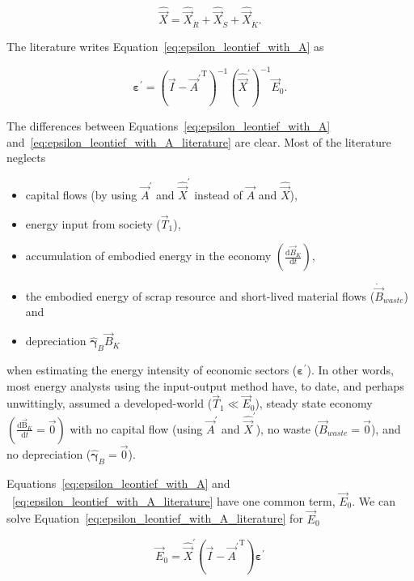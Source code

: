 \begin{equation}
	\hat{\vec{X}} = \hat{\vec{X}}_{\dot{R}} + \hat{\vec{X}}_{\dot{S}} + \hat{\vec{X}}_{\dot{K}}.
\end{equation}

The literature writes Equation~\ref{eq:epsilon_leontief_with_A} as

\begin{equation} \label{eq:epsilon_leontief_with_A_literature}
	\bm{\varepsilon^{'}} 
	= {\left( \vec{I} - {\vec{A}^{'}}^{\mathrm{T}} \right)}^{-1}
	\left( \hat{\vec{X}}^{'} \right) ^{-1}
	\vec{E}_{0}.
\end{equation}

The differences between Equations~\ref{eq:epsilon_leontief_with_A}
and~\ref{eq:epsilon_leontief_with_A_literature} are clear. 
Most of the literature neglects
\begin{itemize}
	\item{capital flows (by using $\vec{A}^{'}$ and $\hat{\vec{X}}^{'}$
			instead of $\vec{A}$ and $\hat{\vec{X}}$),}
	\item{energy input from society ($\vec{T}_{1}$),}
	\item{accumulation of embodied energy in the economy 
			$\left( \frac{\mathrm{d}\vec{B}_{K}}{\mathrm{d}t} \right)$,}
	\item{the embodied energy of scrap resource	and short-lived material flows 
			($\dot{\vec{B}}_{waste}$) and}
	\item{depreciation $\hat{\bm{\gamma}}_{B} \vec{B}_{K}$}
\end{itemize}

\noindent{}when estimating the energy intensity  
of economic sectors ($\bm{\varepsilon}^{'}$).
In other words, most energy analysts using the input-output method
have, to date, and perhaps unwittingly, assumed 
a developed-world ($\vec{T}_{1} \ll \vec{E}_{0}$),
steady state economy
$\left( \frac{\mathrm{d}\mathrm{\vec{B}}_{K}}{\mathrm{d}t}  
= \vec{0} \right)$ 
with 
no capital flow (using $\vec{A}^{'}$ and $\hat{\vec{X}}^{'}$),
no waste ($\vec{B}_{waste} = \vec{0}$), and
no depreciation ($\hat{\bm{\gamma}}_{B} = \vec{0}$).

Equations~\ref{eq:epsilon_leontief_with_A} 
and ~\ref{eq:epsilon_leontief_with_A_literature}
have one common term, $\vec{E}_{0}$.
We can solve Equation~\ref{eq:epsilon_leontief_with_A_literature}
for $\vec{E}_{0}$ 

\begin{equation}
	\vec{E}_{0}
	= \hat{\vec{X}}^{'} \left( \vec{I} - {\vec{A}^{'}}^\mathrm{T} \right) \bm{\varepsilon^{'}} 
\end{equation}

